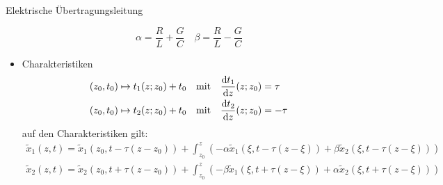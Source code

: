\begin{bsp}{Elektrische Übertragungsleitung}
\begin{itemize}
\[\alpha=\frac{R}{L}+\frac{G}{C} \quad \beta = \frac{R}{L}-\frac{G}{C} \]
\item[] Charakteristiken
\begin{align*}
(z_0,t_0) &\mapsto t_1(z;z_0)+t_0 \quad \mathrm{mit} \quad \frac{\mathrm{d} t_1}{\mathrm{d} z}(z;z_0)=\tau \\
(z_0,t_0) &\mapsto t_2(z;z_0)+t_0 \quad \mathrm{mit} \quad \frac{\mathrm{d} t_2}{\mathrm{d} z}(z;z_0)=-\tau \\
\end{align*}
auf den Charakteristiken gilt: 
\begin{align*}
\tilde{x}_1(z,t) = \tilde{x}_1(z_0,t-\tau(z-z_0))+\int_{z_0}^z\left(-\alpha\tilde{x}_1(\xi,t-\tau(z-\xi))+\beta\tilde{x}_2(\xi,t-\tau(z-\xi))\right) \\
\tilde{x}_2(z,t) = \tilde{x}_2(z_0,t+\tau(z-z_0))+\int_{z_0}^z\left(-\beta\tilde{x}_1(\xi,t+\tau(z-\xi))+\alpha\tilde{x}_2(\xi,t+\tau(z-\xi))\right)
\end{align*}
\end{itemize}
\end{bsp}
